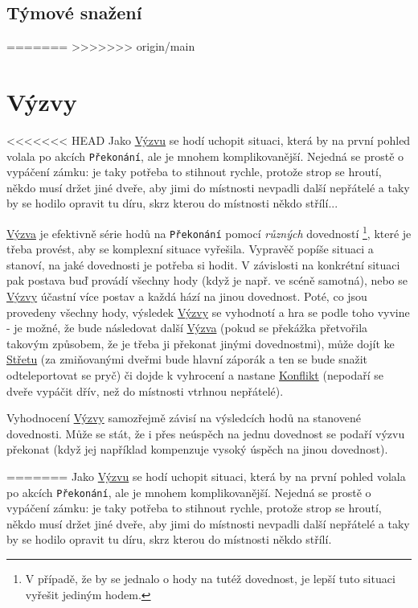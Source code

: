 \documentclass[../main.tex]{subfiles}
\begin{document}
\subsection{Týmové snažení}
\label{sec:tymove-snazeni}

=======
>>>>>>> origin/main

\section{Výzvy}
\label{sec:vyzvy}

<<<<<<< HEAD
Jako \underline{Výzvu} se hodí uchopit situaci, která by na první pohled volala po akcích \texttt{Překonání}, ale je mnohem komplikovanější. Nejedná se prostě o vypáčení zámku: je taky potřeba to stihnout rychle, protože strop se hroutí, někdo musí držet jiné dveře, aby jimi do místnosti nevpadli další nepřátelé a taky by se hodilo opravit tu díru, skrz kterou do místnosti někdo střílí...

\underline{Výzva} je efektivně série hodů na \texttt{Překonání} pomocí \textit{různých} dovedností \footnote{V případě, že by se jednalo o hody na tutéž dovednost, je lepší tuto situaci vyřešit jediným hodem.}, které je třeba provést, aby se komplexní situace vyřešila. Vypravěč popíše situaci a stanoví, na jaké dovednosti je potřeba si hodit. V závislosti na konkrétní situaci pak postava buď provádí všechny hody (když je např. ve scéně samotná), nebo se \underline{Výzvy} účastní více postav a každá hází na jinou dovednost. Poté, co jsou provedeny všechny hody, výsledek \underline{Výzvy} se vyhodnotí a hra se podle toho vyvine - je možné, že bude následovat další \underline{Výzva} (pokud se překážka přetvořila takovým způsobem, že je třeba ji překonat jinými dovednostmi), může dojít ke \underline{Střetu} (za zmiňovanými dveřmi bude hlavní záporák a ten se bude snažit odteleportovat se pryč) či dojde k vyhrocení a nastane \underline{Konflikt} (nepodaří se dveře vypáčit dřív, než do místnosti vtrhnou nepřátelé).

Vyhodnocení \underline{Výzvy} samozřejmě závisí na výsledcích hodů na stanovené dovednosti. Může se stát, že i přes neúspěch na jednu dovednost se podaří výzvu překonat (když jej například kompenzuje vysoký úspěch na jinou dovednost).

=======
Jako \underline{Výzvu} se hodí uchopit situaci, která by na první pohled volala po akcích \texttt{Překonání}, ale je mnohem komplikovanější. Nejedná se prostě o vypáčení zámku: je taky potřeba to stihnout rychle, protože strop se hroutí, někdo musí držet jiné dveře, aby jimi do místnosti nevpadli další nepřátelé a taky by se hodilo opravit tu díru, skrz kterou do místnosti někdo střílí.
\end{document}
